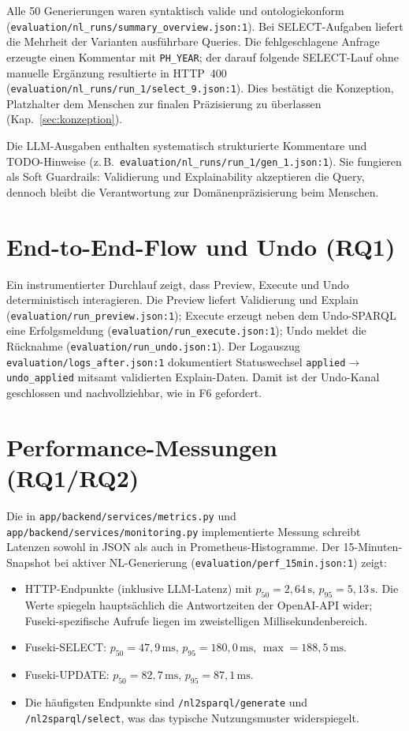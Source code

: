 Alle 50 Generierungen waren syntaktisch valide und ontologiekonform (\texttt{evaluation/nl\_runs/summary\_overview.json:1}). Bei SELECT-Aufgaben liefert die Mehrheit der Varianten ausführbare Queries. Die fehlgeschlagene Anfrage erzeugte einen Kommentar mit \texttt{PH\_YEAR}; der darauf folgende SELECT-Lauf ohne manuelle Ergänzung resultierte in HTTP~400 (\texttt{evaluation/nl\_runs/run\_1/select\_9.json:1}). Dies bestätigt die Konzeption, Platzhalter dem Menschen zur finalen Präzisierung zu überlassen (Kap.~\ref{sec:konzeption}).

Die LLM-Ausgaben enthalten systematisch strukturierte Kommentare und TODO-Hinweise (z.\,B.\ \texttt{evaluation/nl\_runs/run\_1/gen\_1.json:1}). Sie fungieren als Soft Guardrails: Validierung und Explainability akzeptieren die Query, dennoch bleibt die Verantwortung zur Domänenpräzisierung beim Menschen.

\section{End-to-End-Flow und Undo (RQ1)}

Ein instrumentierter Durchlauf zeigt, dass Preview, Execute und Undo deterministisch interagieren. Die Preview liefert Validierung und Explain (\texttt{evaluation/run\_preview.json:1}); Execute erzeugt neben dem Undo-SPARQL eine Erfolgsmeldung (\texttt{evaluation/run\_execute.json:1}); Undo meldet die Rücknahme (\texttt{evaluation/run\_undo.json:1}). Der Logauszug \texttt{evaluation/logs\_after.json:1} dokumentiert Statuswechsel \texttt{applied}$\rightarrow$\texttt{undo\_applied} mitsamt validierten Explain-Daten. Damit ist der Undo-Kanal geschlossen und nachvollziehbar, wie in F6 gefordert.

\section{Performance-Messungen (RQ1/RQ2)}

Die in \texttt{app/backend/services/metrics.py} und \texttt{app/backend/services/monitoring.py} implementierte Messung schreibt Latenzen sowohl in JSON als auch in Prometheus-Histogramme. Der 15-Minuten-Snapshot bei aktiver NL-Generierung (\texttt{evaluation/perf\_15min.json:1}) zeigt:

\begin{itemize}
  \item HTTP-Endpunkte (inklusive LLM-Latenz) mit $p_{50} = 2{,}64\,\mathrm{s}$, $p_{95} = 5{,}13\,\mathrm{s}$. Die Werte spiegeln hauptsächlich die Antwortzeiten der OpenAI-API wider; Fuseki-spezifische Aufrufe liegen im zweistelligen Millisekundenbereich.
  \item Fuseki-SELECT: $p_{50} = 47{,}9\,\mathrm{ms}$, $p_{95} = 180{,}0\,\mathrm{ms}$, $ \max = 188{,}5\,\mathrm{ms}$.
  \item Fuseki-UPDATE: $p_{50} = 82{,}7\,\mathrm{ms}$, $p_{95} = 87{,}1\,\mathrm{ms}$.
  \item Die häufigsten Endpunkte sind \texttt{/nl2sparql/generate} und \texttt{/nl2sparql/select}, was das typische Nutzungsmuster widerspiegelt.
\end{itemize}

